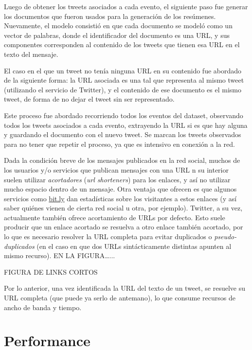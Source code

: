 \documentclass[upright, contnum]{umemoria}
\begin{document}
    Luego de obtener los tweets asociados a cada evento, el siguiente
    paso fue generar los documentos que fueron usados para la
    generación de los resúmenes. Nuevamente, el modelo consistió en que cada
    documento se modeló como un vector de palabras, donde el
    identificador del documento es una URL, y sus componentes
    corresponden al contenido de los tweets que tienen esa URL en el
    texto del mensaje.

    El caso en el que un tweet no tenía ninguna URL en su contenido
    fue abordado de la siguiente forma: la URL asociada es una tal que
    representa al mismo tweet (utilizando el servicio de Twitter), y
    el contenido de ese documento es el mismo tweet, de forma de no
    dejar el tweet sin ser representado.

    Este proceso fue abordado recorriendo todos los eventos del
    dataset, observando todos los tweets asociados a cada evento,
    extrayendo la URL si es que hay alguna y guardando el documento
    con el nuevo tweet. Se marcan los tweets observados para no tener
    que repetir el proceso, ya que es intensivo en conexión a la red.

    Dada la condición breve de los mensajes publicados en la red
    social, muchos de los usuarios y/o servicios que publican mensajes
    con una URL n su interior suelen utilizar \emph{acortadores} (\emph{url shorteners})
    para los enlaces, y así no utilizar mucho espacio dentro de un
    mensaje. Otra ventaja que ofrecen es que algunos servicios como
    \hyperref[sec-6.2.3]{bit.ly} dan estadísticas sobre los visitantes a estos enlaces (y
    así saber quiénes vienen de cierta red social u otra, por
    ejemplo). Twitter, a su vez, actualmente también ofrece
    acortamiento de URLs por defecto. Esto suele producir que un enlace
    acortado se resuelva a otro enlace también acortado, por lo que es
    necesario resolver la URL completa para evitar duplicados o
    \emph{pseudo-duplicados} (en el caso en que dos URLs sintácticamente
    distintas apunten al mismo recurso). EN LA FIGURA\ldots{}...

    FIGURA DE LINKS CORTOS

    Por lo anterior, una vez identificada la URL del texto de un
    tweet, se resuelve su URL completa (que puede ya serlo de
    antemano), lo que consume recursos de ancho de banda y
    tiempo. 

\section{Performance}
\label{sec-6.3}
\end{document}
